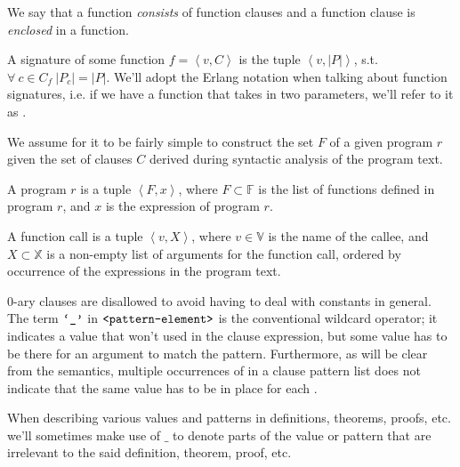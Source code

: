 We say that a function \emph{consists} of function clauses and a function
clause is \emph{enclosed} in a function.

\begin{definition} A signature of some function $f=\left\langle v, C
\right\rangle$ is the tuple $\left\langle v,|P| \right\rangle$, s.t.
$\forall\ c\in C_f\ |P_c|=|P|$. We'll adopt the Erlang notation when talking
about function signatures, i.e. if we have a function  that takes in
two parameters, we'll refer to it as .\end{definition}

We assume for it to be fairly simple to construct the set $F$ of a given
program $r$ given the set of clauses $C$ derived during syntactic analysis of
the program text.

\begin{definition} A program $r$ is a tuple $\left\langle F,x \right\rangle$,
where $F\subset\mathbb{F}$ is the list of functions defined in program $r$, and
$x$ is the expression of program $r$.\end{definition}

\begin{definition}\label{definition:function-call} A function call is a tuple
$\left\langle v, X \right\rangle$, where $v\in\mathbb{V}$ is the name of the
callee, and $X\subset\mathbb{X}$ is a non-empty list of arguments for the
function call, ordered by occurrence of the expressions in the program
text.\end{definition}

0-ary clauses are disallowed to avoid having to deal with constants in general.
The term $\text{{\ttfamily`\_'}}$ in $\text{{\ttfamily<pattern-element>}}$ is the conventional
wildcard operator; it indicates a value that won't used in the clause
expression, but some value has to be there for an argument to match the
pattern. Furthermore, as will be clear from the semantics, multiple occurrences
of \term{\_} in a clause pattern list does not indicate that the same value has
to be in place for each \term{\_}. 

\begin{definition} When describing various values and patterns in definitions,
theorems, proofs, etc. we'll sometimes make use of $\_$ to denote parts of the
value or pattern that are irrelevant to the said definition, theorem, proof,
etc.\end{definition}


